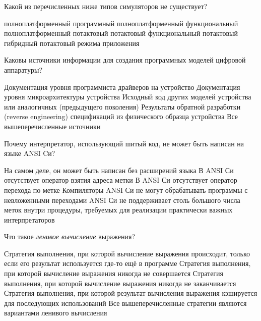 \documentclass[a4paper, addpoints]{exam}
\begin{document}
\begin{questions}


\question[2] Какой из перечисленных ниже типов симуляторов не существует?
\begin{choices}
\choice полноплатформенный программный
\choice полноплатформенный функциональный
\choice полноплатформенный потактовый
\correctchoice потактовый функциональный
\choice потактовый гибридный
\choice потактовый режима приложения
\end{choices}


\question[2] Каковы источники информации для создания программных моделей цифровой аппаратуры?
\begin{choices}
\choice Документация уровня программиста драйверов на устройство
\choice Документация уровня микроархитектуры устройства
\choice Исходный код других моделей устройства или аналогичных (предыдущего поколения)
\choice Результаты обратной разработки (reverse engineering) спецификаций из физического образца устройства
\correctchoice Все вышеперечисленные источники
\end{choices}

\question[2] Почему интерпретатор, использующий шитый код, не может быть написан на языке ANSI Cи?
\begin{choices}
\choice На самом деле, он может быть написан без расширений языка
\correctchoice В ANSI Си отсутствует оператор взятия адреса метки
\choice В ANSI Си отсутствует оператор перехода по метке
\choice Компиляторы ANSI Си не могут обрабатывать программы с невложенными переходами
\choice ANSI Си не поддерживает столь большого числа меток внутри процедуры, требуемых для реализации практически важных интерпретаторов
\end{choices}

\question[2] Что такое \textit{ленивое вычисление} выражения?
\begin{choices}
\correctchoice Стратегия выполнения, при которой вычисление выражения происходит, только если его результат используется где-то ещё в программе
\choice Стратегия выполнения, при которой вычисление выражения никогда не совершается
\choice Стратегия выполнения, при которой вычисление выражения никогда не заканчивается
\choice Стратегия выполнения, при которой результат вычисления выражения кэшируется для последующих использований
\choice Все вышеперечисленные стратегии являются вариантами ленивого вычисления
\end{choices}

\newpage
\phantom{Blank page}

\end{questions}
\end{document}
